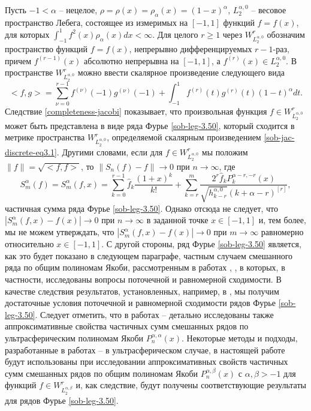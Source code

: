 Пусть $-1<\alpha$ -- нецелое, $\rho=\rho(x)=\rho_\alpha(x)=(1-x)^\alpha$,  $L_2^{\alpha,0}$ --  весовое пространство Лебега, состоящее
из измеримых на $[-1,1]$ функций $f=f(x)$, для которых $\int_{-1}^1f^2(x)\rho_\alpha(x)dx<\infty$. Для целого  $r\ge1$ через $W^r_{L_2^{\alpha,0}}$ обозначим пространство функций $f=f(x)$, непрерывно дифференцируемых $r-1$-раз, причем $f^{(r-1)}(x)$ абсолютно непрерывна на $[-1,1]$, а $f^{(r)}(x)\in L_2^{\alpha,0} $. В пространстве  $W^r_{L_2^{\alpha,0}}$ можно ввести скалярное произведение следующего вида
\begin{equation}\label{sob-jac-discrete-eq3.1}
<f,g>=\sum_{\nu=0}^{r-1}f^{(\nu)}(-1)g^{(\nu)}(-1)+\int_{-1}^{1} f^{(r)}(t)g^{(r)}(t)(1-t)^\alpha dt.
\end{equation}
Следствие \ref{completeness-jacobi} показывает, что произвольная  функция $f\in W^r_{L_2^{\alpha,0}}$ может быть представлена в виде ряда Фурье \eqref{sob-leg-3.50}, который сходится в метрике пространства $W^r_{L_2^{\alpha,0}}$, определяемой скалярным произведением \eqref{sob-jac-discrete-eq3.1}.
 Другими словами, если для $f\in W^r_{L_2^{\alpha,0}}$ мы положим $\|f\|=\sqrt{<f,f>}$, то $\|S_n(f)-f\|\to 0$ при $n\to\infty$, где
\begin{equation}\label{sob-jac-discrete-3.10}
S_m^\alpha(f)=S_m^\alpha(f,x)=
 \sum_{k=0}^{r-1}\hat f_k\frac{(1+x)^k}{k!}+ \sum_{k=r}^{m} \frac{2^r\hat f_kP_{k}^{\alpha-r,-r}(x)}{\sqrt{h_{k-r}^{\alpha,0}}(k+\alpha-r)^{[r]}},
     \end{equation}
 частичная сумма ряда Фурье \eqref{sob-leg-3.50}.  Однако отсюда не следует, что $|S_m^\alpha(f,x)-f(x)|\to 0$ при $n\to\infty$ в заданной точке $x\in[-1,1]$ и, тем более,  мы не можем утверждать, что $|S_m^\alpha(f,x)-f(x)|\to 0$ при $m\to\infty$ равномерно относительно  $x\in[-1,1]$. С другой стороны, ряд Фурье  \eqref{sob-leg-3.50} является, как  это будет показано в следующем параграфе, частным случаем смешанного ряда по общим полиномам Якоби, рассмотренным в работах \cite{Haar-Tcheb-Shar13},   \cite{Haar-Tcheb-Shar18},  в которых, в частности, исследованы  вопросы поточечной и равномерной сходимости. В качестве следствия результатов, установленных, например,  в \cite{Haar-Tcheb-Shar18}, мы получим достаточные условия поточечной и равномерной сходимости рядов Фурье \eqref{sob-leg-3.50}. Следует отметить, что в работах \cite{Haar-Tcheb-Shar11} -- \cite{sob-jac-discrete-Shar17} детально исследованы также аппроксимативные свойства  частичных сумм смешанных рядов по ультрасферическим полиномам Якоби $P_n^{\alpha,\alpha}(x)$. Некоторые  методы и подходы, разработанные в работах  \cite{Haar-Tcheb-Shar11} -- \cite{sob-jac-discrete-Shar17} в ультрасферическом случае, в настоящей работе будут использованы при исследовании аппроксимативных свойств частичных сумм смешанных рядов по общим полиномам Якоби  $P_n^{\alpha,\beta}(x)$ с $\alpha,\beta>-1$  для функций $f\in W^r_{L_2^{\alpha,\beta}}$  и, как следствие, будут получены соответствующие результаты для рядов Фурье  \eqref{sob-leg-3.50}.
